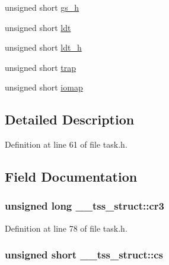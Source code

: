\begin{DoxyCompactItemize}
unsigned short \hyperlink{struct____tss__struct_a724b8bddadd1b77d08b16d4292f3ac77}{gs\+\_\+h}
\item 
unsigned short \hyperlink{struct____tss__struct_a16d41b1184cf4d1a2af29cd288635c78}{ldt}
\item 
unsigned short \hyperlink{struct____tss__struct_a8b926ac70ecae62767750d002da4112e}{ldt\+\_\+h}
\item 
unsigned short \hyperlink{struct____tss__struct_a1bb5da85377e5612cddb13b0ac403e4e}{trap}
\item 
unsigned short \hyperlink{struct____tss__struct_a2ee32c201d129f8ee19dfd510b5d69fd}{iomap}
\end{DoxyCompactItemize}


\subsection{Detailed Description}


Definition at line 61 of file task.\+h.



\subsection{Field Documentation}
\subsubsection[{\texorpdfstring{cr3}{cr3}}]{\setlength{\rightskip}{0pt plus 5cm}unsigned long \+\_\+\+\_\+tss\+\_\+struct\+::cr3}\hypertarget{struct____tss__struct_afd7f71893266af35fef0279fb2f9af42}{}\label{struct____tss__struct_afd7f71893266af35fef0279fb2f9af42}


Definition at line 78 of file task.\+h.

\subsubsection[{\texorpdfstring{cs}{cs}}]{\setlength{\rightskip}{0pt plus 5cm}unsigned short \+\_\+\+\_\+tss\+\_\+struct\+::cs}\hypertarget{struct____tss__struct_adbf2980b4b9a4b505dbb3886ad657357}{}\label{struct____tss__struct_adbf2980b4b9a4b505dbb3886ad657357}


